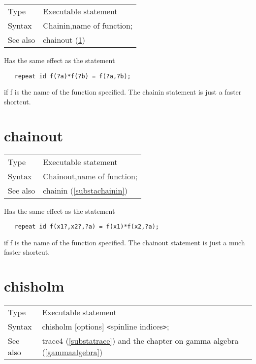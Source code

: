 \noindent \begin{tabular}{ll}
Type & Executable statement\\
Syntax & Chainin,name of function;
\\ See also & chainout (\ref{substachainout})
\end{tabular} \vspace{4mm}

\noindent Has the same effect as the statement
\begin{verbatim}
   repeat id f(?a)*f(?b) = f(?a,?b);
\end{verbatim}
if f is the name of the function specified. The chainin statement is just a 
faster shortcut. \vspace{10mm}

 
\section{chainout}
\label{substachainout}

\noindent \begin{tabular}{ll}
Type & Executable statement\\
Syntax & Chainout,name of function;
\\ See also & chainin (\ref{substachainin})
\end{tabular} \vspace{4mm}

\noindent Has the same effect as the statement
\begin{verbatim}
   repeat id f(x1?,x2?,?a) = f(x1)*f(x2,?a);
\end{verbatim}
if f is the name of the function specified. The chainout statement is just a 
much faster shortcut. \vspace{10mm}


\section{chisholm}
\label{substachisholm}

\noindent \begin{tabular}{ll}
Type & Executable statement\\
Syntax & chisholm [options] {\tt<}spinline indices{\tt>}; \\
See also & trace4 (\ref{substatrace}) and the chapter on gamma algebra 
(\ref{gammaalgebra})
\end{tabular} \vspace{4mm}

